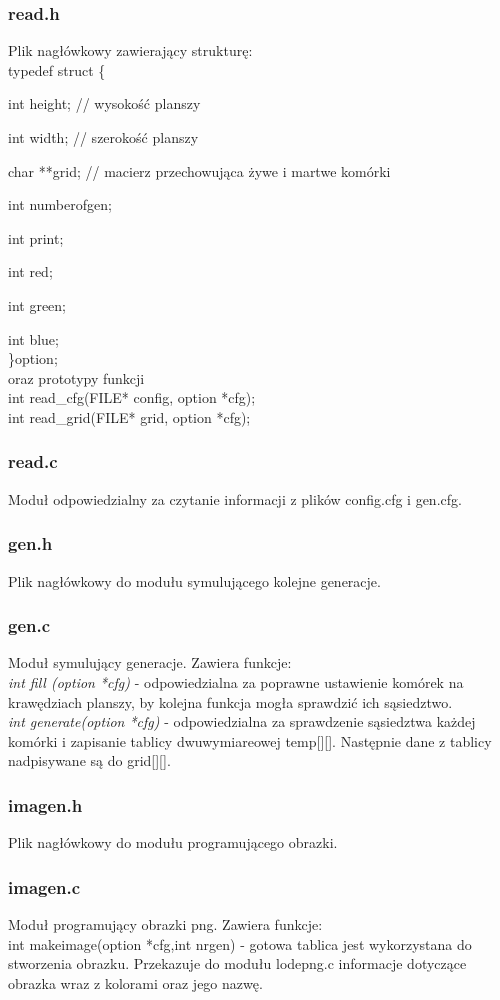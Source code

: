 \documentclass{article}
\begin{document}
\subsubsection*{read.h}
Plik nagłówkowy zawierający strukturę:\\
typedef struct \{\par
int height; // wysokość planszy\par
	int width; // szerokość planszy\par
	char **grid; // macierz przechowująca żywe i martwe komórki\par
	int numberofgen;\par
	int print;\par
	int red;\par
	int green;\par
	int blue;\\
\}option;\\
oraz prototypy funkcji \\
int read\_cfg(FILE* config, option *cfg);\\
int read\_grid(FILE* grid, option *cfg);\\
\subsubsection*{read.c}
Moduł odpowiedzialny za czytanie informacji z plików config.cfg i gen.cfg.
\subsubsection*{gen.h}
Plik nagłówkowy do modułu symulującego kolejne generacje.
\subsubsection*{gen.c}
Moduł symulujący generacje. Zawiera funkcje:\\
\emph{int fill (option *cfg) }- odpowiedzialna za poprawne ustawienie komórek na krawędziach planszy, by kolejna funkcja mogła sprawdzić ich sąsiedztwo.\\
\emph{int  generate(option *cfg)} - odpowiedzialna za sprawdzenie sąsiedztwa każdej komórki i zapisanie tablicy dwuwymiareowej temp[][]. Następnie dane z tablicy nadpisywane są do grid[][].
\subsubsection*{imagen.h}
Plik nagłówkowy do modułu programującego obrazki.
\subsubsection*{imagen.c}
Moduł programujący obrazki png. Zawiera funkcje:\\
int makeimage(option *cfg,int nrgen) - gotowa tablica jest wykorzystana do stworzenia obrazku. Przekazuje do modułu lodepng.c informacje dotyczące obrazka wraz z kolorami oraz jego nazwę.
\end{document}

